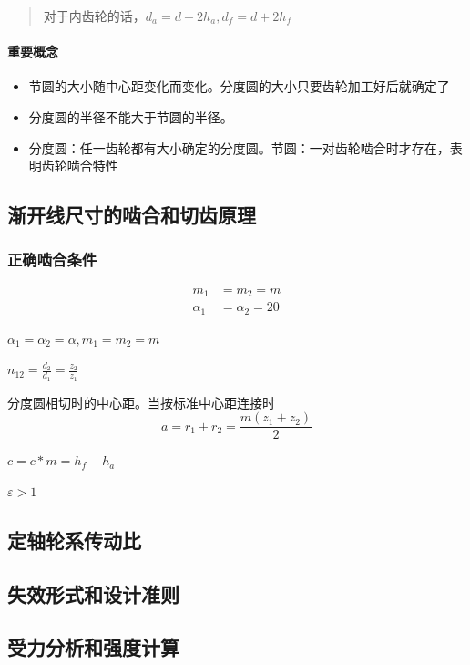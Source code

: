 \documentclass[twocolumn]{ctexart}
\begin{document}
\begin{quote}
{\qquad{}\ccwd\kaishu{}
对于内齿轮的话，$d_a=d-2h_a,d_f=d+2h_f$
}
\end{quote}
\paragraph{重要概念}
\begin{itemize}
\item 节圆的大小随中心距变化而变化。分度圆的大小只要齿轮加工好后就确定了
\item 分度圆的半径不能大于节圆的半径。
\item 分度圆：任一齿轮都有大小确定的分度圆。节圆：一对齿轮啮合时才存在，表明齿轮啮合特性
\end{itemize}

\subsection{渐开线尺寸的啮合和切齿原理}
\subsubsection{正确啮合条件}
\begin{align*}
  m_1&=m_2=m\\
\alpha_1&=\alpha_2=20
\end{align*}
\begin{description}[leftmargin=1.3cm,style=nextline,nosep]%
  \item[正确啮合条件] $\alpha_{1}=\alpha_2=\alpha,m_1=m_2=m$ 
  \item[传动比] $n_{12}=\frac{d_2}{d_1}=\frac{z_2}{z_1}$ 
  \item[标准中心距] 分度圆相切时的中心距。当按标准中心距连接时
   $$
   a=r_1+r_2=\frac{m(z_1+z_2)}{2}
   $$
   \item[顶隙] $c=c*m=h_f-h_a$ 
   \item[连续传动] $\varepsilon >1$ 
\end{description}

\subsection{定轴轮系传动比}
\subsection{失效形式和设计准则} 
\subsection{受力分析和强度计算}
\end{document}
